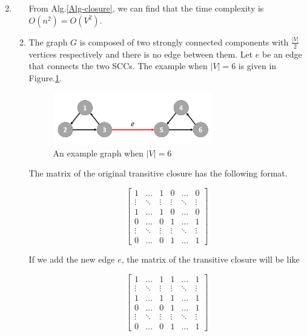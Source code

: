\documentclass[12pt,a4paper]{article}
\makeatletter
\newtheorem*{solution}{Solution}
\theoremstyle{definition}
\renewenvironment{solution}[1][Solution] {\par\pushQED{\qed}\normalfont\topsep6\p@\@plus6\p@\relax\trivlist\item[\hskip\labelsep\bfseries#1\@addpunct{.}]\ignorespaces}{\popQED\endtrivlist\@endpefalse} \makeatother
\makeatother
\begin{document}
\begin{enumerate}
\begin{solution}
\begin{enumerate}
    From Alg.\ref{Alg-closure}, we can find that the time complexity is $O(n^2)=O(V^2)$.
    
    \item
    The graph $G$ is composed of two strongly connected components with $\frac{|V|}{2}$ vertices respectively and there is no edge between them. Let $e$ be an edge that connects the two SCCs. The example when $|V|=6$ is given in Figure.\ref{Fig-closure}.
    \begin{figure}[!htbp]
    	\centering
    	\includegraphics[width=0.7\textwidth]{Fig-closure.pdf}
    	\caption{An example graph when $|V|=6$}
    	\label{Fig-closure}
    \end{figure}
    
    The matrix of the original transitive closure has the following format.
    
     \begin{equation*}
     \left[
     \begin{array}{cccccc}
         1 & \dots & 1 & 0 & \dots & 0 \\
         \vdots & \ddots & \vdots & \vdots & \ddots & \vdots \\
         1 & \dots & 1 & 0 & \dots & 0 \\ 
         0 & \dots & 0 & 1 & \dots & 1 \\
         \vdots & \ddots & \vdots & \vdots & \ddots & \vdots \\
         0 & \dots & 0 & 1 & \dots & 1
     \end{array}
     \right]        
     \end{equation*}
    
    If we add the new edge $e$, the matrix of the transitive closure will be like
    
     \begin{equation*}
     \left[
     \begin{array}{cccccc}
         1 & \dots & 1 & 1 & \dots & 1 \\
         \vdots & \ddots & \vdots & \vdots & \ddots & \vdots \\
         1 & \dots & 1 & 1 & \dots & 1 \\ 
         0 & \dots & 0 & 1 & \dots & 1 \\
         \vdots & \ddots & \vdots & \vdots & \ddots & \vdots \\
         0 & \dots & 0 & 1 & \dots & 1
     \end{array}
     \right]        
     \end{equation*}
    

\end{enumerate}
\end{solution}
\end{enumerate}
\end{document}
